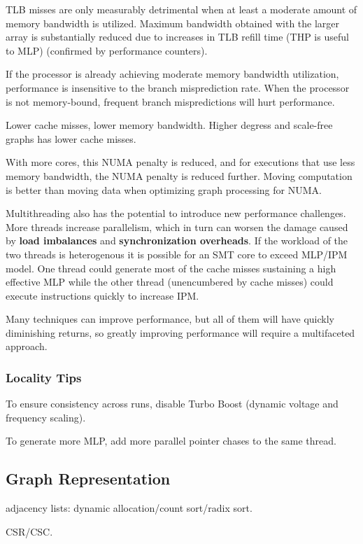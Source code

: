\documentclass[UTF8,12pt,a4paper]{article}
\begin{document}
TLB misses are only measurably detrimental when
at least a moderate amount of memory bandwidth is utilized.
Maximum bandwidth obtained with the larger array is substantially
reduced due to increases in TLB refill time (THP is useful to MLP)
(confirmed by performance counters).

If the processor is already achieving moderate memory bandwidth utilization,
performance is insensitive to the branch misprediction rate.
When the processor is not memory-bound,
frequent branch mispredictions will hurt performance.

Lower cache misses, lower memory bandwidth.
Higher degress and scale-free graphs has lower cache misses.

With more cores, this NUMA penalty is reduced,
and for executions that use less memory bandwidth,
the NUMA penalty is reduced further.
Moving computation is better than moving data
when optimizing graph processing for NUMA.

Multithreading also has the potential to introduce new performance challenges.
More threads increase parallelism, which in turn can worsen the damage
caused by \textbf{load imbalances} and \textbf{synchronization overheads}.
If the workload of the two threads is heterogenous it is possible
for an SMT core to exceed MLP/IPM model.
One thread could generate most of the cache misses
sustaining a high effective MLP
while the other thread (unencumbered by cache misses)
could execute instructions quickly to increase IPM.

Many techniques can improve performance,
but all of them will have quickly diminishing returns,
so greatly improving performance will require a multifaceted approach.
\subsubsection{Locality Tips}
\begin{compactitem}
  \item To ensure consistency across runs,
  disable Turbo Boost (dynamic voltage and frequency scaling).
  \item To generate more MLP,
  add more parallel pointer chases to the same thread.
\end{compactitem}

\subsection{Graph Representation}
\begin{compactitem}
  \item adjacency lists: dynamic allocation/count sort/radix sort.
  \item CSR/CSC.
\end{compactitem}
\end{document}
